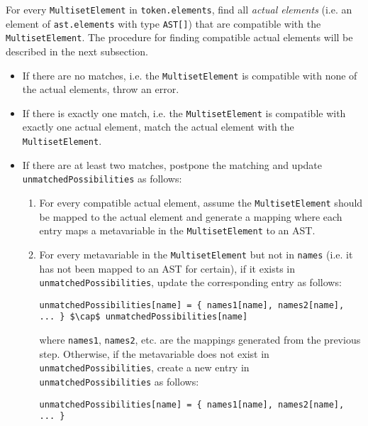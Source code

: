 For every \lstinline{MultisetElement} in \lstinline{token.elements}, find all \textit{actual elements} (i.e. an element of \lstinline{ast.elements} with type \lstinline{AST[]}) that are compatible with the \lstinline{MultisetElement}. The procedure for finding compatible actual elements will be described in the next subsection.
\begin{itemize}
    \item If there are no matches, i.e. the \lstinline{MultisetElement} is compatible with none of the actual elements, throw an error.
    \item If there is exactly one match, i.e. the \lstinline{MultisetElement} is compatible with exactly one actual element, match the actual element with the \lstinline{MultisetElement}.
    \item If there are at least two matches, postpone the matching and update \lstinline{unmatchedPossibilities} as follows:
    \begin{enumerate}
        \item For every compatible actual element, assume the \lstinline{MultisetElement} should be mapped to the actual element and generate a mapping where each entry maps a metavariable in the \lstinline{MultisetElement} to an AST.
        \item For every metavariable in the \lstinline{MultisetElement} but not in \lstinline{names} (i.e. it has not been mapped to an AST for certain), if it exists in \lstinline{unmatchedPossibilities}, update the corresponding entry as follows:
        \begin{center}
            \lstinline|unmatchedPossibilities[name] = { names1[name], names2[name], ... } $\cap$ unmatchedPossibilities[name]|
        \end{center}
        where \lstinline{names1}, \lstinline{names2}, etc. are the mappings generated from the previous step. Otherwise, if the metavariable does not exist in \lstinline{unmatchedPossibilities}, create a new entry in \lstinline{unmatchedPossibilities} as follows:
        \begin{center}
            \lstinline|unmatchedPossibilities[name] = { names1[name], names2[name], ... }|
        \end{center}
    \end{enumerate}
\end{itemize}

